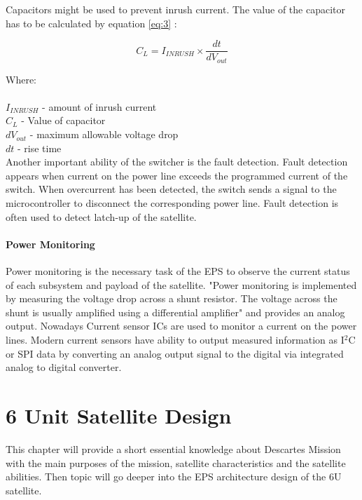  Capacitors might be used to prevent inrush current. The value of the capacitor has to be calculated by equation \ref{eq:3} \cite{32}:
 
 \begin{equation}\label{eq:3}
 C_{L} = I_{INRUSH} \times \dfrac{dt}{dV_{out}}
 \end{equation}
 
 Where:\\ \\
 $I_{INRUSH}$ - amount of inrush current\\
 $C_{L}$ - Value of capacitor \\
 $dV_{out}$ - maximum allowable voltage drop\\
 $dt$ - rise time\\

Another important ability of the switcher is the fault detection. Fault detection appears when current on the power line exceeds the programmed current of the switch. When overcurrent has been detected, the switch sends a signal to the microcontroller to disconnect the corresponding power line. Fault detection is often used to detect latch-up of the satellite.\\

\subsubsection{Power Monitoring}

Power monitoring is the necessary task of the EPS to observe the current status of each subsystem and payload of the satellite. \cite{22} "Power monitoring is implemented by measuring the voltage drop across a shunt resistor.  The voltage across the shunt  is  usually  amplified  using  a  differential amplifier" and  provides an analog output. Nowadays Current sensor ICs are used to monitor a current on the power lines. Modern current sensors have ability to output measured information as I$^{2}$C or SPI data by converting an analog output signal to the digital via integrated analog to digital converter. 


\chapter{6 Unit Satellite Design \label{chapter3}}
This chapter will provide a short essential knowledge about Descartes Mission with the main purposes of the mission, satellite characteristics and the satellite  abilities. Then topic will go deeper into the EPS architecture design of the 6U satellite. \\
